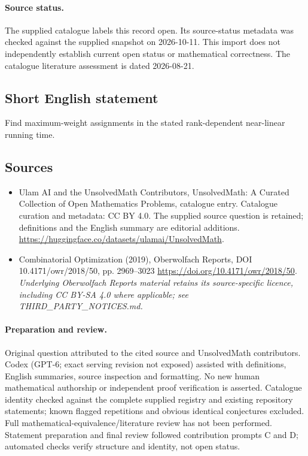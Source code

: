 \documentclass[11pt]{article}
\begin{document}
\paragraph{Source status.}
The supplied catalogue labels this record open. Its source-status metadata was checked against the supplied snapshot on 2026-10-11. This import does not independently establish current open status or mathematical correctness. The catalogue literature assessment is dated 2026-08-21.
\subsection{Short English statement}
Find maximum-weight assignments in the stated rank-dependent near-linear running time.
\subsection{Sources}
\begin{itemize}
\item[S1] Ulam AI and the UnsolvedMath Contributors, UnsolvedMath: A Curated Collection of Open Mathematics Problems, catalogue entry. Catalogue curation and metadata: CC BY 4.0. The supplied source question is retained; definitions and the English summary are editorial additions.
\url{https://huggingface.co/datasets/ulamai/UnsolvedMath}.
\item[S2] Combinatorial Optimization (2019), Oberwolfach Reports, DOI 10.4171/owr/2018/50, pp. 2969--3023
\url{https://doi.org/10.4171/owr/2018/50}.
\textit{Underlying Oberwolfach Reports material retains its source-specific licence, including CC BY-SA 4.0 where applicable; see THIRD\_PARTY\_NOTICES.md.}
\end{itemize}
\paragraph{Preparation and review.}
Original question attributed to the cited source and UnsolvedMath contributors. Codex (GPT-6; exact serving revision not exposed) assisted with definitions, English summaries, source inspection and formatting. No new human mathematical authorship or independent proof verification is asserted. Catalogue identity checked against the complete supplied registry and existing repository statements; known flagged repetitions and obvious identical conjectures excluded. Full mathematical-equivalence/literature review has not been performed. Statement preparation and final review followed contribution prompts C and D; automated checks verify structure and identity, not open status.
\label{end:statement}
\end{document}
